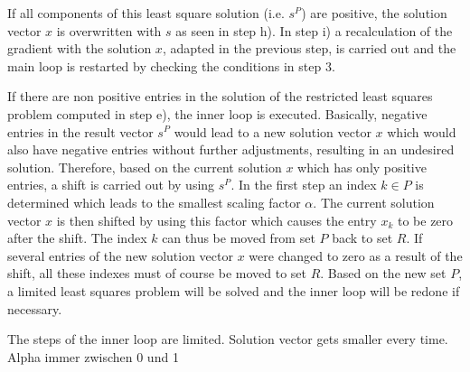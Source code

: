 If all components of this least square solution (i.e. $s^P$) are positive, the solution vector $x$ is overwritten with $s$ as seen in step h). In step i) a recalculation of the gradient with the solution $x$, adapted in the previous step, is carried out and the main loop is restarted by checking the conditions in step 3. 

If there are non positive entries in the solution of the restricted least squares problem computed in step e), the inner loop is executed. Basically, negative entries in the result vector $s^P$ would lead to a new solution vector $x$ which would also have negative entries without further adjustments, resulting in an undesired solution. Therefore, based on the current solution $x$ which has only positive entries, a shift is carried out by using $s^P$. In the first step an index $k \in P$ is determined which leads to the smallest scaling factor $\alpha$. The current solution vector $x$ is then shifted by using this factor which causes the entry $x_k$ to be zero after the shift. The index $k$ can thus be moved from set $P$ back to set $R$. If several entries of the new solution vector $x$ were changed to zero as a result of the shift, all these indexes must of course be moved to set $R$. Based on the new set $P$, a limited least squares problem will be solved and the inner loop will be redone if necessary.

The steps of the inner loop are limited.
Solution vector gets smaller every time.
Alpha immer zwischen 0 und 1







